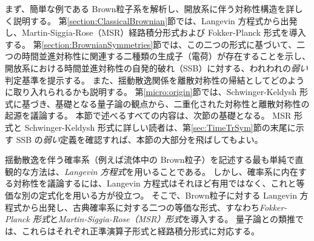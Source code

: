 まず、簡単な例である Brown粒子系を解析し、開放系に伴う対称性構造を詳しく説明する。
第\ref{section:ClassicalBrownian}節では、Langevin 方程式から出発し、Martin-Siggia-Rose（MSR）経路積分形式および Fokker-Planck 形式を導入する。
第\ref{section:BrownianSymmetries}節では、この二つの形式に基づいて、二つの時間並進対称性に関連する二種類の生成子（電荷）が存在することを示し、開放系における時間並進対称性の自発的破れ（SSB）に対する、われわれの\textit{弱い}判定基準を提示する。
また、揺動散逸関係を離散対称性の帰結としてどのように取り入れられるかも説明する。
第\ref{micro:origin}節では、Schwinger-Keldysh 形式に基づき、基礎となる量子論の観点から、二重化された対称性と離散対称性の起源を議論する。
本節で述べるすべての内容は、次節の基礎となる。
MSR 形式と Schwinger-Keldysh 形式に詳しい読者は、第\ref{sec:TimeTrSym}節の末尾に示す SSB の\textit{弱い}定義を確認すれば、本節の大部分を飛ばしてもよい。


\label{section:ClassicalBrownian}
揺動散逸を伴う確率系（例えば流体中の Brown粒子）を記述する最も単純で直観的な方法は、\textit{Langevin 方程式}を用いることである。
しかし、確率系に内在する対称性を議論するには、Langevin 方程式はそれほど有用ではなく、これと等価な別の定式化を用いる方が役立つ。
そこで、Brown粒子に対する Langevin 方程式から出発し、古典確率系に対する二つの等価な形式、すなわち\textit{Fokker-Planck 形式}と\textit{Martin-Siggia-Rose（MSR）形式}を導入する。
量子論との類推では、これらはそれぞれ正準演算子形式と経路積分形式に対応する。


